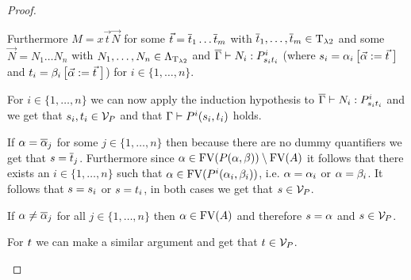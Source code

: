 \begin{proof}
\begin{itemize}
		Furthermore $M=x\vec{t}\vec{N}$ for some $\predTVec=\predTVec[1]\dots \predTVec[m]$ with $\predTVec[1],\dots,\predTVec[m]\in\lambdaTypes$ and some $\vec{N}=N_1\dots N_n$ with $N_1,\dots,N_n\in\Lambda_{\text{T}_{\lambda2}}$ and $\trans{\Gamma}\lambdaModels N_i:\code{P^i}{\predTFst[i]}{\predTSnd[i]}$ (where $\predTFst[i]=\predFst[i]\left[\predVec:=\predTVec\hspace{1mm}\right]$ and  $\predTSnd[i]=\predSnd[i]\left[\predVec:=\predTVec\hspace{1mm}\right]$) for $i\in\{1,\dots,n\}$.
		
		
		
		\begin{figure}[H]
			\centering
			
		\end{figure}
		
		For $i\in\{1,\dots,n\}$ we can now apply the induction hypothesis to $\trans{\Gamma}\lambdaModels N_i:\code{P^i}{\predTFst[i]}{\predTSnd[i]}$ and we get that $\predTFst[i],\predTSnd[i]\in\VarP$ and that $\Gamma\PModels P^i(\predTFst[i],\predTSnd[i])$ holds.
		
		If $\predFst=\predVec[j]$ for some $j\in\{1,\dots,n\}$ then because there are no dummy quantifiers we get that $\predTFst=\predTVec[j]$. Furthermore since $\alpha\in\FV(P(\predFst,\predSnd))\setminus\FV(A)$ it follows that there exists an $i\in\{1,\dots,n\}$ such that $\predFst\in\FV(P^i(\predFst[i],\predSnd[i]))$, i.e. $\predFst=\predFst[i]$ or $\predFst=\predSnd[i]$. It follows that $\predTFst=\predTFst[i]$ or $\predTFst=\predTSnd[i]$, in both cases we get that $\predTFst\in\VarP$.
		
		If $\predFst\neq\predVec[j]$ for all $j\in\{1,\dots,n\}$ then $\predFst\in\FV(A)$ and therefore $\predTFst=\predFst$ and $\predTFst\in\VarP$.
		
		For $\predTSnd$ we can make a similar argument and get that $\predTSnd\in\VarP$.
		

\end{itemize}
\end{proof}
